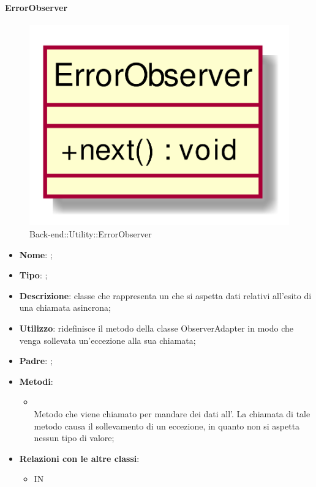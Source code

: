 \hypertarget{ErrorObserver_label}{\paragraph{ErrorObserver}}
\begin{figure}[h]
	\centering
	\includegraphics[width=\textwidth,height=\textheight,keepaspectratio]{images/ClassErrorObserver.png}
	\caption{Back-end::Utility::ErrorObserver}
\end{figure}
\begin{itemize}
	\item \textbf{Nome}: ;
	\item \textbf{Tipo}: ;
	\item \textbf{Descrizione}: classe che rappresenta un  che si aspetta dati relativi all'esito di una chiamata asincrona;
	\item \textbf{Utilizzo}: ridefinisce il metodo  della classe ObserverAdapter in modo che venga sollevata un'eccezione alla sua chiamata;
	\item \textbf{Padre}: ;
	\item \textbf{Metodi}:
	\begin{itemize}
		\item[]  \\
		Metodo che viene chiamato per mandare dei dati all'. La chiamata di tale metodo causa il sollevamento di un eccezione, in quanto  non si aspetta nessun tipo di valore;\\
	\end{itemize}
	\item \textbf{Relazioni con le altre classi}:
	\begin{itemize}
		\item IN \hyperlink{ErrorObservable_label}{}
	\end{itemize}
\end{itemize}
\FloatBarrier

